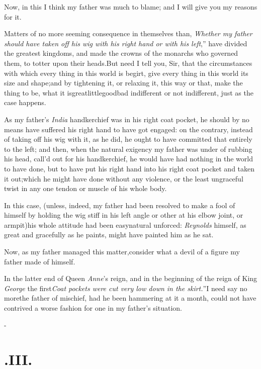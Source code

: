 \documentclass{article}
\begin{document}
\tsh Now, in this I think my father was much to blame;
and I will give you my reasons for it.

Matters of no more seeming consequence in themselves than,
\lqq\textit{Whether\break
my father should have taken off his wig\break
with his right hand or with his left},”\tsh\break
have divided the greatest kingdoms, and made the crowns of the
monarchs who governed them, to totter upon their\break
heads.\tsk But need I tell you, Sir, that the circumstances with
which every thing in this world is begirt, give every thing in
this world its size and shape;\tsk and by tightening it, or
relaxing it, this way or that, make the thing to be, what it
is\tsh\break great\tsk little\tsk good\tsk bad\tsk
indifferent or not indifferent, just
as the case happens.

As my father’s \textit{India} handkerchief was in his right coat pocket, he should
by no means have suffered his right hand to have got engaged: on the contrary,
instead of taking off his wig with it, as he did, he ought to have committed that
entirely to the left; and then, when the natural exigency my father was under of
rubbing his head, call’d out for his handkerchief, he would have had nothing in the
world to have done, but to have put his right hand into his right coat pocket and
taken it out;\tsk which he might have done without any violence, or the least
ungraceful twist in any one tendon or muscle of his whole body.

In this case, (unless, indeed, my father had been resolved to make a fool of himself
by holding the wig stiff in his left  angle or
other at his elbow joint, or arm\-pit)\tsk his whole attitude had been easy\tsk natural\tsk
unforced: \textit{Reynolds} himself, as great and gracefully as he paints, might
have painted him as he sat.

Now, as my father managed this matter,\tsk consider what a
devil of a figure my father made of himself.

\tsk In the latter end of Queen \textit{Anne}’s reign, and in the beginning of the
reign of King \textit{George} the first\tsk \lqq\textit{Coat pockets were cut very low
down in the skirt.}”\tsh I need say no more\tsh the father of mischief, had he been
hammering at it a month, could not have contrived a worse fashion for one in my
father’s situation.

\null\kern-\baselineskip
\section{.\quad  III.}
\end{document}
